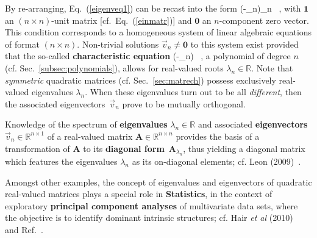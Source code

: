\medskip
\noindent
By re-arranging, Eq.~(\ref{eigenveq1}) can be recast into the form
%
\be
{}
 \stackrel{!}{=}
\left(-\lambda_{n}\right)_{n} \ ,
\ee
%
with $\boldsymbol{1}$ an $(n \times n)$-unit matrix
[cf.\ Eq.~(\ref{einmatr})] and $\boldsymbol{0}$ an $n$-component 
zero vector. This condition corresponds to a homogeneous system of 
linear algebraic equations of format $(n \times n)$. Non-trivial 
solutions $\vec{v}_{n} \neq \boldsymbol{0}$ to this system exist 
provided that the so-called {\bf characteristic equation}
%
 \stackrel{!}{=} 
\det\left(-\lambda_{n}\right) \ ,
\ee
%
a polynomial of degree $n$ (cf. Sec.~\ref{subsec:polynomials}), 
allows for real-valued roots $\lambda_{n} \in \mathbb{R}$. Note 
that \emph{symmetric} quadratic matrices (cf. 
Sec.~\ref{sec:matrech}) possess exclusively real-valued 
eigenvalues $\lambda_{n}$. When these eigenvalues turn out to be 
all \emph{different}, then the associated 
eigenvectors~$\vec{v}_{n}$ prove to be mutually orthogonal.

\medskip
\noindent
Knowledge of the spectrum of {\bf eigenvalues} $\lambda_{n} \in 
\mathbb{R}$ and associated {\bf eigenvectors} $\vec{v}_{n} \in 
\mathbb{R}^{n \times 1}$ of a real-valued matrix
$\mathbf{A} \in \mathbb{R}^{n \times n}$ provides the basis of a 
transformation of $\mathbf{A}$ to its {\bf diagonal 
form}~$\mathbf{A}_{\lambda_{n}}$, thus yielding a diagonal matrix 
which features the eigenvalues $\lambda_{n}$ as its on-diagonal 
elements; cf. Leon (2009)~.

\medskip
\noindent
Amongst other examples, the concept of eigenvalues and 
eigenvectors of quadratic real-valued matrices plays a special 
role in {\bf Statistics}, in the context of exploratory {\bf 
principal component analyses} of multivariate data sets, where the 
objective is to identify dominant intrinsic structures; cf. Hair 
\emph{et al} (2010)~ and 
Ref.~.

